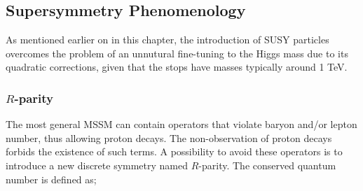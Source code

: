 



		\subsection{Supersymmetry Phenomenology}

			As mentioned earlier on in this chapter, the introduction of SUSY particles overcomes the problem of an unnutural fine-tuning to the Higgs mass due to its quadratic corrections, given that the stops have masses typically around 1 TeV.

			\subsubsection*{$R$-parity}
				
				The most general MSSM can contain operators that violate baryon and/or lepton number, thus allowing proton decays. The non-observation of proton decays forbids the existence of such terms. A possibility to avoid these operators is to introduce a new discrete symmetry named $R$-parity. The conserved quantum number is defined as;

